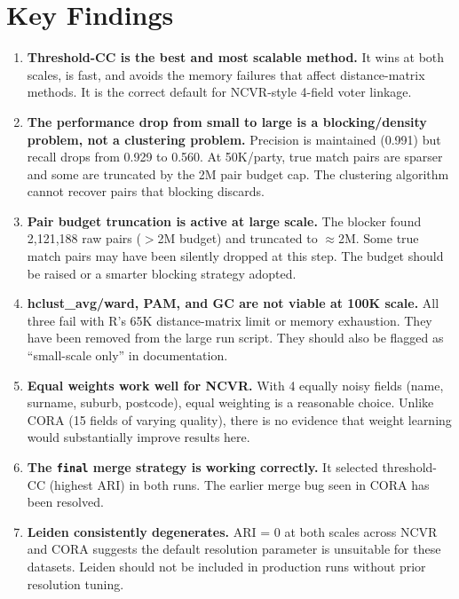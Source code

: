 \documentclass[11pt, a4paper]{article}
\begin{document}
\section{Key Findings}

\begin{enumerate}[leftmargin=*, label=\arabic*.]
  \item \textbf{Threshold-CC is the best and most scalable method.} It wins
        at both scales, is fast, and avoids the memory failures that affect
        distance-matrix methods. It is the correct default for NCVR-style
        4-field voter linkage.

  \item \textbf{The performance drop from small to large is a blocking/density
        problem, not a clustering problem.} Precision is maintained (0.991) but
        recall drops from 0.929 to 0.560. At 50K/party, true match pairs are
        sparser and some are truncated by the 2M pair budget cap. The clustering
        algorithm cannot recover pairs that blocking discards.

  \item \textbf{Pair budget truncation is active at large scale.}
        The blocker found 2,121,188 raw pairs ($>$2M budget) and truncated to
        $\approx$2M. Some true match pairs may have been silently dropped at this
        step. The budget should be raised or a smarter blocking strategy adopted.

  \item \textbf{hclust\_avg/ward, PAM, and GC are not viable at 100K scale.}
        All three fail with R's 65K distance-matrix limit or memory exhaustion.
        They have been removed from the large run script. They should also be
        flagged as ``small-scale only'' in documentation.

  \item \textbf{Equal weights work well for NCVR.} With 4 equally noisy fields
        (name, surname, suburb, postcode), equal weighting is a reasonable
        choice. Unlike CORA (15 fields of varying quality), there is no evidence
        that weight learning would substantially improve results here.

  \item \textbf{The \texttt{final} merge strategy is working correctly.}
        It selected threshold-CC (highest ARI) in both runs. The earlier merge
        bug seen in CORA has been resolved.

  \item \textbf{Leiden consistently degenerates.} ARI = 0 at both scales
        across NCVR and CORA suggests the default resolution parameter is
        unsuitable for these datasets. Leiden should not be included in
        production runs without prior resolution tuning.
\end{enumerate}
\end{document}
